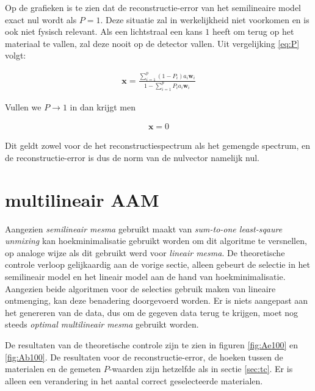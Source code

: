 \documentclass[12pt]{report}
\begin{document}
Op de grafieken is te zien dat de reconstructie-error van het semilineaire model exact nul wordt als $P=1$. Deze situatie zal in werkelijkheid niet voorkomen en is ook niet fysisch relevant. Als een lichtstraal een kans $1$ heeft om terug op het materiaal te vallen, zal deze nooit op de detector vallen. Uit vergelijking \ref{eq:P} volgt:

\begin{align}
\bm{x} = \frac{\sum_{i=1}^p (1-P_i) a_{i} \bm{w}_{i}}{1-\sum_{i=1}^p P_i a_{i} \bm{w}_{i}}
\end{align}

Vullen we $P \rightarrow 1$ in dan krijgt men

\begin{align}
\bm{x} = 0
\end{align}

Dit geldt zowel voor de het reconstructiespectrum als het gemengde spectrum, en de reconstructie-error is dus de norm van de nulvector namelijk nul.
 

\section{multilineair AAM} \label{sec:MAAM}

Aangezien \textit{semilineair mesma} gebruikt maakt van \textit{sum-to-one least-sqaure unmixing} kan hoekminimalisatie gebruikt worden om dit algoritme te versnellen, op analoge wijze als dit gebruikt werd voor \textit{lineair mesma}. De theoretische controle verloop gelijkaardig aan de vorige sectie, alleen gebeurt de selectie in het semilineair model en het lineair model aan de hand van hoekminimalisatie. Aangezien beide algoritmen voor de selecties gebruik maken van lineaire ontmenging, kan deze benadering doorgevoerd worden. Er is niets aangepast aan het genereren van de data, dus om de gegeven data terug te krijgen, moet nog steeds \textit{optimal multilineair mesma} gebruikt worden.

De resultaten van de theoretische controle zijn te zien in figuren \ref{fig:Ae100} en \ref{fig:Ab100}. De resultaten voor de reconstructie-error, de hoeken tussen de materialen en de gemeten $P$-waarden zijn hetzelfde als in sectie \ref{sec:tc}. Er is alleen een verandering in het aantal correct geselecteerde materialen.
\end{document}

